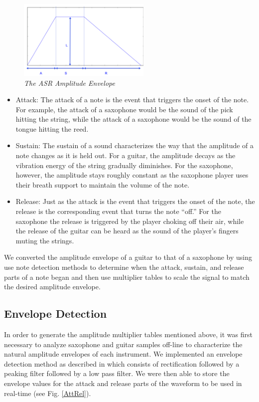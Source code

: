 \documentclass[twoside,a4paper]{article}
\begin{document}
\begin{figure}[ht]
  \includegraphics[width=2.5in]{Pictures/ASR.png}
  \centering
  \caption{\label{AmpEnv} {\it The ASR Amplitude Envelope}}
  \centering
  \end{figure}

\begin{itemize}
\item Attack: The attack of a note is the event that triggers the onset
of the note. For example, the attack of a saxophone would be the sound of the pick
hitting the string, while the attack of a saxophone would be the sound of the tongue
hitting the reed.

\item Sustain: The sustain of a sound characterizes the way that the amplitude of
a note changes as it is held out. For a guitar, the amplitude decays as the vibration
energy of the string gradually diminishes. For the saxophone, however, the amplitude
stays roughly constant as the saxophone player uses their breath
support to maintain the volume of the note.

\item Release: Just as the attack is the event that triggers the onset of
the note, the release is the corresponding event that turns the note ``off.''
For the saxophone the release is triggered by the player choking off their air,
while the release of the guitar can be heard as the sound of the player's fingers
muting the strings.
\end{itemize}

\noindent
We converted the amplitude envelope of a
guitar to that of a saxophone by using use note detection methods to determine when
the attack, sustain, and release parts of a note began
and then use multiplier
tables to scale the signal to match the desired amplitude envelope.

\subsection{Envelope Detection}
In order to generate the amplitude multiplier tables mentioned above,
it was first necessary to analyze saxophone and guitar samples off-line
to characterize the natural amplitude envelopes of each instrument. We
implemented an envelope detection method as described in \cite{DBLP:journals/corr/Jarne17}
which consists of rectification followed by a peaking filter followed by a low pass filter.
We were then able to store the envelope values for the attack and release parts of the waveform
to be used in real-time (see Fig. \ref{AttRel}).
\end{document}
